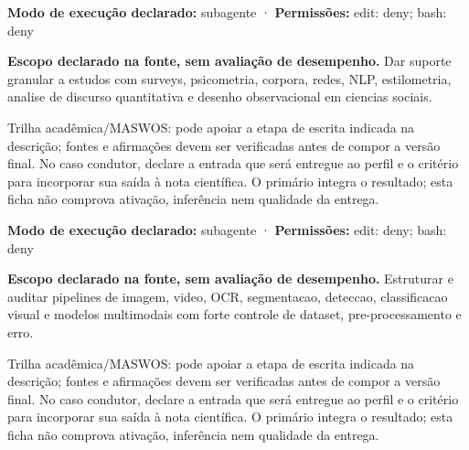 \begin{arquitetura}
\textbf{Modo de execução declarado:} subagente · \textbf{Permissões:} edit: deny; bash: deny
\end{arquitetura}


\begin{descricao}
\textbf{Escopo declarado na fonte, sem avaliação de desempenho.}
Dar suporte granular a estudos com surveys, psicometria, corpora, redes, NLP, estilometria, analise de discurso quantitativa e desenho observacional em ciencias sociais.
\end{descricao}

\begin{funcao}
Trilha acadêmica/MASWOS: pode apoiar a etapa de escrita indicada na descrição; fontes e afirmações devem ser verificadas antes de compor a versão final. No caso condutor, declare a entrada que será entregue ao perfil e o critério para incorporar sua saída à nota científica. O primário integra o resultado; esta ficha não comprova ativação, inferência nem qualidade da entrega.
\end{funcao}

\begin{arquitetura}
\textbf{Modo de execução declarado:} subagente · \textbf{Permissões:} edit: deny; bash: deny
\end{arquitetura}


\begin{descricao}
\textbf{Escopo declarado na fonte, sem avaliação de desempenho.}
Estruturar e auditar pipelines de imagem, video, OCR, segmentacao, deteccao, classificacao visual e modelos multimodais com forte controle de dataset, pre-processamento e erro.
\end{descricao}

\begin{funcao}
Trilha acadêmica/MASWOS: pode apoiar a etapa de escrita indicada na descrição; fontes e afirmações devem ser verificadas antes de compor a versão final. No caso condutor, declare a entrada que será entregue ao perfil e o critério para incorporar sua saída à nota científica. O primário integra o resultado; esta ficha não comprova ativação, inferência nem qualidade da entrega.
\end{funcao}

